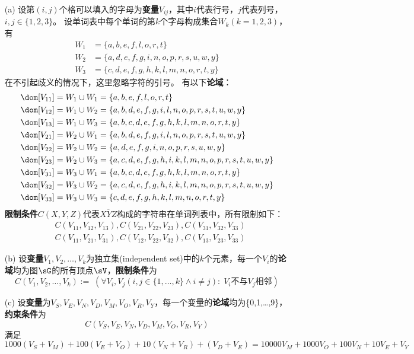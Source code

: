 \documentclass[a4paper, 11pt]{article}
\begin{document}
\begin{answer}
\begin{itemize}
\item [(a)] 设第$(i,j)$个格可以填入的字母为\textbf{变量}$V_{ij}$，其中$i$代表行号，$j$代表列号，$i,j\in\{1,2,3\}$。
设单词表中每个单词的第$k$个字母构成集合$W_k(k=1,2,3)$，有
\[\begin{aligned}
    W_1 &= \{a,b,e,f,l,o,r,t\}\\
    W_2 &= \{a,d,e,f,g,i,n,o,p,r,s,u,w,y\}\\
    W_3 &= \{c,d,e,f,g,h,k,l,m,n,o,r,t,y\}
\end{aligned}\]
在不引起歧义的情况下，这里忽略字符的引号。
有以下\textbf{论域}：
\[\begin{aligned}
\dom[V_{11}] &= W_1\cup W_1 = \{a,b,e,f,l,o,r,t\}\\
\dom[V_{12}] &= W_1\cup W_2 = \{a,b,d,e,f,g,i,l,n,o,p,r,s,t,u,w,y\}\\
\dom[V_{13}] &= W_1\cup W_3 = \{a,b,c,d,e,f,g,h,k,l,m,n,o,r,t,y\}\\
\dom[V_{21}] &= W_2\cup W_1 = \{a,b,d,e,f,g,i,l,n,o,p,r,s,t,u,w,y\}\\
\dom[V_{22}] &= W_2\cup W_2 = \{a,d,e,f,g,i,n,o,p,r,s,u,w,y\}\\
\dom[V_{23}] &= W_2\cup W_3 = \{a,c,d,e,f,g,h,i,k,l,m,n,o,p,r,s,t,u,w,y\}\\
\dom[V_{31}] &= W_3\cup W_1 = \{a,b,c,d,e,f,g,h,k,l,m,n,o,r,t,y\}\\
\dom[V_{32}] &= W_3\cup W_2 = \{a,c,d,e,f,g,h,i,k,l,m,n,o,p,r,s,t,u,w,y\}\\
\dom[V_{33}] &= W_3\cup W_3 = \{c,d,e,f,g,h,k,l,m,n,o,r,t,y\}
\end{aligned}\]
\textbf{限制条件}$C(X,Y,Z)$代表$\overline{XYZ}$构成的字符串在单词列表中，所有限制如下：
\[\begin{aligned}
    & C(V_{11},V_{12},V_{13}),C(V_{21},V_{22},V_{23}),C(V_{31},V_{32},V_{33})\\
    & C(V_{11},V_{21},V_{31}),C(V_{12},V_{22},V_{32}),C(V_{13},V_{23},V_{33})
\end{aligned}\]

\item [(b)] 设\textbf{变量}$V_1,V_2,\ldots,V_k$为独立集(independent set)中的$k$个元素，每一个$V_i$的\textbf{论域}均为图$\sG$的所有顶点$\sV$，\textbf{限制条件}为
\[C(V_1,V_2,\ldots,V_k):=\;(\forall V_i,V_j(i,j\in\{1,\ldots,k\}\land i\ne j):\;V_i\text{不与}V_j\text{相邻})\]

\item [(c)] 设\textbf{变量}为$V_S,V_E,V_N,V_D,V_M,V_O,V_R,V_Y$，每一个变量的\textbf{论域}均为\{0,1,\ldots,9\}，\textbf{约束条件}为
\[C(V_S,V_E,V_N,V_D,V_M,V_O,V_R,V_Y)\]
满足
\[1000(V_S+V_M)+100(V_E+V_O)+10(V_N+V_R)+(V_D+V_E)=10000V_M+1000V_O+100V_N+10V_E+V_Y\]
\end{itemize}
\end{answer}
\end{document}
